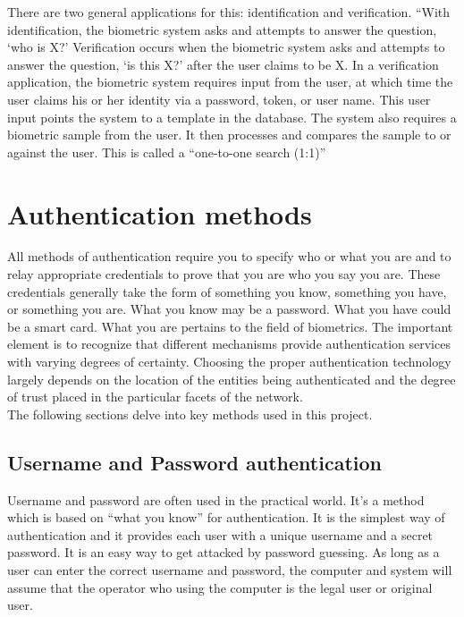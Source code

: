 \documentclass[12pt]{report}			%
\begin{document}
There are two general applications for this: identification and verification. “With identification, the biometric system asks and attempts to answer the question, ‘who is X?’ Verification occurs when the biometric system asks and attempts to answer the question, ‘is this X?’ after the user claims to be X. In a verification application, the biometric system requires input from the user, at which time the user claims his or her identity via a password, token, or user name. This user input points the system to a template in the database. The system also requires a biometric sample from the user. It then processes and compares the sample to or against the user. This is called a “one-to-one search (1:1)”

\section{ Authentication methods }
All methods of authentication require you to specify who or what you are and to relay appropriate credentials to prove that you are who you say you are. These credentials generally take the form of something you know, something you have, or something you are. What you know may be a password. What you have could be a smart card. What you are pertains to the field of biometrics. The important element is to recognize that different mechanisms provide authentication services with varying degrees of certainty. Choosing the proper authentication technology largely depends on the location of the entities being authenticated and the degree of
trust placed in the particular facets of the network.\\
The following sections delve into key methods used in this project.

\subsection{ Username and Password authentication }
Username and password are often used in the practical world. It’s a method which is based on “what you know” for authentication. It is the simplest way of authentication and it provides each user with a unique username and a secret password. It is an easy way to get attacked by password guessing. As long as a user can enter the correct username and password, the computer and system will assume that the operator who using the computer is the legal user or original user.
\end{document}
